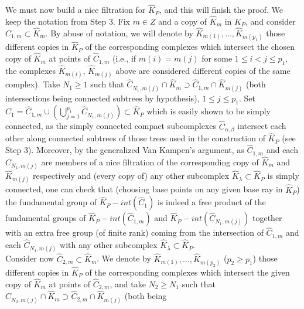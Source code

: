 \documentclass{amsart}[12pt]
\theoremstyle{definition}
\theoremstyle{remark}
\numberwithin{equation}{section}
\begin{document}
 We must now build a nice filtration for
$\widehat{K}_P$, and this will finish the proof. We keep the
notation from Step $3$. Fix $m \in {Z}$ and a copy of
$\widehat{K}_m$ in $\widehat{K}_P$, and consider
$\widehat{C}_{1,m} {\subset} \widehat{K}_m$. By abuse of notation, we
will denote by $\widehat{K}_{m(1)}, \dots , \widehat{K}_{m(p_1)}$
those different copies in $\widehat{K}_P$ of the corresponding
complexes which intersect the chosen copy of $\widehat{K}_m$ at
points of $\widehat{C}_{1,m}$ (i.e., if $m(i)=m(j)$ for some $1
\leq i < j \leq p_1$, the complexes $\widehat{K}_{m(i)}$,
$\widehat{K}_{m(j)}$ above are considered different copies of the
same complex). Take $N_1 \geq 1$ such that $\widehat{C}_{N_1,
m(j)} \cap \widehat{K}_m \supset \widehat{C}_{1,m} \cap
\widehat{K}_{m(j)}$ (both intersections being connected subtrees
by hypothesis), $1 \leq j \leq p_1$. Set $\widehat{C}_1 =
\widehat{C}_{1,m} \cup \displaystyle \left( \bigcup_{j=1}^{p_1}
\widehat{C}_{N_1, m(j)} \right) {\subset} \widehat{K}_P$ which is
easily shown to be simply connected, as the simply connected
compact subcomplexes $\widehat{C}_{\alpha, \beta}$ intersect each
other along connected subtrees of those trees used in the
construction of $\widehat{K}_P$ (see Step $3$). Moreover, by the
generalized Van Kampen's argument, as $\widehat{C}_{1,m}$ and each
$\widehat{C}_{N_1, m(j)}$ are members of a nice filtration of the
corresponding copy of $\widehat{K}_m$ and $\widehat{K}_{m(j)}$
respectively and (every copy of) any other subcomplex
$\widehat{K}_\lambda {\subset} \widehat{K}_P$ is simply connected, one
can check that (choosing base points on any given base ray in
$\widehat{K}_P$) the fundamental group of $\widehat{K}_P -
int(\widehat{C}_1)$ is indeed a free product of the fundamental
groups of $\widehat{K}_P - int(\widehat{C}_{1,m})$ and
$\widehat{K}_P - int(\widehat{C}_{N_1, m(j)})$ together with an
extra free group (of finite rank) coming from the intersection of
$\widehat{C}_{1,m}$ and each $\widehat{C}_{N_1, m(j)}$ with any
other subcomplex $\widehat{K}_\lambda {\subset} \widehat{K}_P$.\\
\indent Consider now $\widehat{C}_{2,m} {\subset} \widehat{K}_m$. We
denote by $\widehat{K}_{m(1)}, \dots , \widehat{K}_{m(p_2)}$ ($p_2
\geq p_1$) those different copies in $\widehat{K}_P$ of the
corresponding complexes which intersect the given copy of
$\widehat{K}_m$ at points of $\widehat{C}_{2,m}$, and take $N_2
\geq N_1$ such that $\widehat{C}_{N_2, m(j)} \cap \widehat{K}_m
\supset \widehat{C}_{2,m} \cap \widehat{K}_{m(j)}$ (both being
\end{document}
